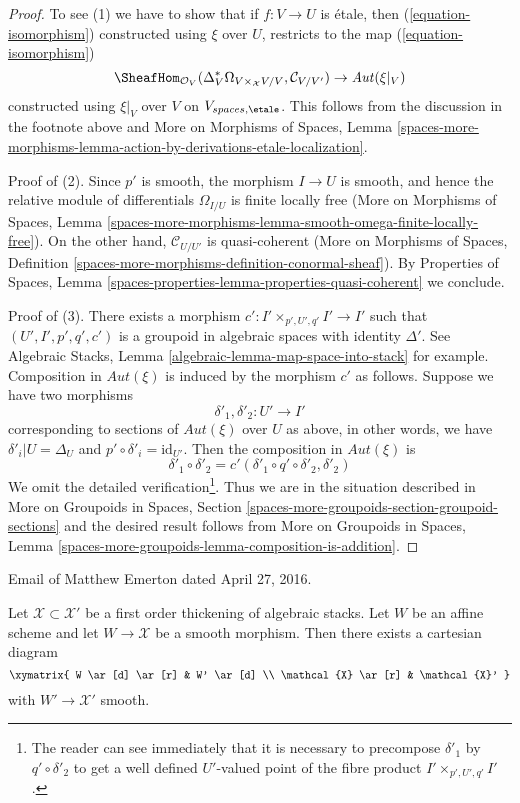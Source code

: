 \begin{proof}
\medskip\noindent
To see (1) we have to show that if $f : V \to U$ is \'etale,
then (\ref{equation-isomorphism}) constructed using $\xi$ over $U$,
restricts to the map (\ref{equation-isomorphism})
$$
\SheafHom_{\mathcal{O}_V}(
\Delta_V^*\Omega_{V \times_\mathcal{X} V/V}, \mathcal{C}_{V/V'}) \to
\mathit{Aut}(\xi|_V)
$$
constructed using $\xi|_V$ over $V$ on $V_{spaces, \etale}$.
This follows from the discussion in the footnote above
and More on Morphisms of Spaces, Lemma
\ref{spaces-more-morphisms-lemma-action-by-derivations-etale-localization}.

\medskip\noindent
Proof of (2). Since $p'$ is smooth, the morphism $I \to U$ is smooth,
and hence the relative module of differentials $\Omega_{I/U}$
is finite locally free (More on Morphisms of Spaces, Lemma
\ref{spaces-more-morphisms-lemma-smooth-omega-finite-locally-free}).
On the other hand, $\mathcal{C}_{U/U'}$ is quasi-coherent
(More on Morphisms of Spaces, Definition
\ref{spaces-more-morphisms-definition-conormal-sheaf}).
By Properties of Spaces, Lemma
\ref{spaces-properties-lemma-properties-quasi-coherent}
we conclude.

\medskip\noindent
Proof of (3). There exists a morphism $c' : I' \times_{p', U', q'} I' \to I'$
such that $(U', I', p', q', c')$ is a groupoid in algebraic spaces
with identity $\Delta'$. See
Algebraic Stacks, Lemma \ref{algebraic-lemma-map-space-into-stack} for example.
Composition in $\mathit{Aut}(\xi)$ is induced by the morphism
$c'$ as follows. Suppose we have two morphisms
$$
\delta'_1, \delta'_2 : U' \longrightarrow I'
$$
corresponding to sections of $\mathit{Aut}(\xi)$ over $U$ as above,
in other words, we have $\delta'_i|U = \Delta_U$ and
$p' \circ \delta'_i = \text{id}_{U'}$. Then the composition
in $\mathit{Aut}(\xi)$ is
$$
\delta'_1 \circ \delta'_2 = c'(\delta'_1 \circ q' \circ \delta'_2, \delta'_2)
$$
We omit the detailed verification\footnote{The reader can see immediately
that it is necessary to precompose
$\delta'_1$ by $q' \circ \delta'_2$ to get a well defined $U'$-valued
point of the fibre product $I' \times_{p', U', q'} I'$.}.
Thus we are in the situation described in
More on Groupoids in Spaces, Section
\ref{spaces-more-groupoids-section-groupoid-sections}
and the desired result follows from
More on Groupoids in Spaces, Lemma
\ref{spaces-more-groupoids-lemma-composition-is-addition}.
\end{proof}

\begin{proposition}[Emerton]
\label{proposition-affine-smooth-lift-to-first-order}
\begin{reference}
Email of Matthew Emerton dated April 27, 2016.
\end{reference}
Let $\mathcal{X} \subset \mathcal{X}'$ be a first order thickening
of algebraic stacks. Let $W$ be an affine scheme and let
$W \to \mathcal{X}$ be a smooth morphism. Then there exists
a cartesian diagram
$$
\xymatrix{
W \ar[d] \ar[r] & W' \ar[d] \\
\mathcal{X} \ar[r] & \mathcal{X}'
}
$$
with $W' \to \mathcal{X}'$ smooth.
\end{proposition}

